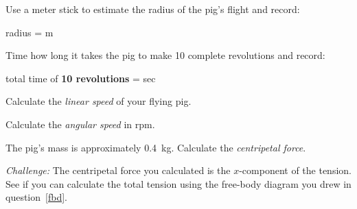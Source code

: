 \documentclass[10pt]{exam}
\begin{document}
\begin{questions}
\question
  Use a meter stick to estimate the radius of the pig's flight and record: 

  \vspace{1em}

  radius = \fillin[][6em] m

  \vspace{1em}

\question
  Time how long it takes the pig to make 10 complete revolutions and record: 

  \vspace{1em}
  
  total time of {\bf 10 revolutions} = \fillin[][6em] sec

  \vspace{1em}

\question
  Calculate the \emph{linear speed} of your flying pig. 
  \vs

\question
  Calculate the \emph{angular speed} in rpm.
  \vs


\question
  The pig's mass is approximately 0.4~kg.  Calculate the \emph{centripetal force}.
  \vs

\question
  \emph{Challenge:} The centripetal force you calculated is the $x$-component of the tension.  See if you can calculate the total tension using the free-body diagram you drew in question~\ref{fbd}.
  \vs


  


\end{questions}
\end{document}
